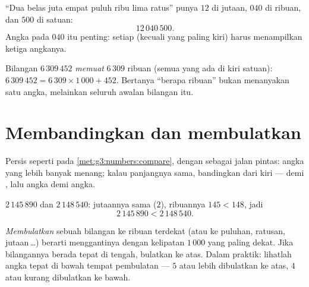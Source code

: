 \begin{example}\label{ex:g4:numbers:write}
``Dua belas juta empat puluh ribu lima ratus'' punya $12$ di 
jutaan, $040$ di  ribuan, dan $500$ di  satuan:
\[
12\,040\,500 .
\]
Angka  pada $040$ itu penting: setiap  (kecuali yang paling
kiri) harus menampilkan ketiga angkanya.
\end{example}

\begin{example}\label{ex:g4:numbers:contained}
Bilangan $6\,309\,452$ \emph{memuat} $6\,309$ ribuan (semua yang ada
di kiri  satuan): $6\,309\,452 = 6\,309 \times
1\,000 + 452$. Bertanya ``berapa ribuan'' bukan menanyakan satu
angka, melainkan seluruh awalan bilangan itu.
\end{example}

\section{Membandingkan dan membulatkan}

\begin{method}\label{met:g4:numbers:compare}
Persis seperti pada \cref{met:g3:numbers:compare}, dengan 
sebagai jalan pintas: angka yang lebih banyak menang; kalau
panjangnya sama, bandingkan dari kiri ---  demi , lalu
angka demi angka.
\end{method}

\begin{example}\label{ex:g4:numbers:compare}
$2\,145\,890$ dan $2\,148\,540$: jutaannya sama ($2$), 
ribuannya $145 < 148$, jadi
\[
2\,145\,890 < 2\,148\,540 .
\]
\end{example}

\begin{definition}[Pembulatan]\label{def:g4:numbers:round}
\emph{Membulatkan} sebuah bilangan ke ribuan
terdekat (atau ke puluhan, ratusan, jutaan\,\dots) berarti
menggantinya dengan kelipatan $1\,000$ yang paling dekat. Jika
bilangannya berada tepat di tengah, bulatkan ke atas. Dalam praktik:
lihatlah angka tepat di bawah tempat pembulatan --- $5$ atau lebih
dibulatkan ke atas, $4$ atau kurang dibulatkan ke bawah.
\end{definition}

